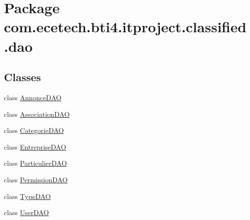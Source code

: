 \hypertarget{namespacecom_1_1ecetech_1_1bti4_1_1itproject_1_1classified_1_1dao}{}\section{Package com.\+ecetech.\+bti4.\+itproject.\+classified.\+dao}
\label{namespacecom_1_1ecetech_1_1bti4_1_1itproject_1_1classified_1_1dao}
\subsection*{Classes}
\begin{DoxyCompactItemize}
\item 
class \hyperlink{classcom_1_1ecetech_1_1bti4_1_1itproject_1_1classified_1_1dao_1_1_annonce_d_a_o}{Annonce\+D\+AO}
\item 
class \hyperlink{classcom_1_1ecetech_1_1bti4_1_1itproject_1_1classified_1_1dao_1_1_association_d_a_o}{Association\+D\+AO}
\item 
class \hyperlink{classcom_1_1ecetech_1_1bti4_1_1itproject_1_1classified_1_1dao_1_1_categorie_d_a_o}{Categorie\+D\+AO}
\item 
class \hyperlink{classcom_1_1ecetech_1_1bti4_1_1itproject_1_1classified_1_1dao_1_1_entreprise_d_a_o}{Entreprise\+D\+AO}
\item 
class \hyperlink{classcom_1_1ecetech_1_1bti4_1_1itproject_1_1classified_1_1dao_1_1_particulier_d_a_o}{Particulier\+D\+AO}
\item 
class \hyperlink{classcom_1_1ecetech_1_1bti4_1_1itproject_1_1classified_1_1dao_1_1_permission_d_a_o}{Permission\+D\+AO}
\item 
class \hyperlink{classcom_1_1ecetech_1_1bti4_1_1itproject_1_1classified_1_1dao_1_1_type_d_a_o}{Type\+D\+AO}
\item 
class \hyperlink{classcom_1_1ecetech_1_1bti4_1_1itproject_1_1classified_1_1dao_1_1_user_d_a_o}{User\+D\+AO}
\end{DoxyCompactItemize}
